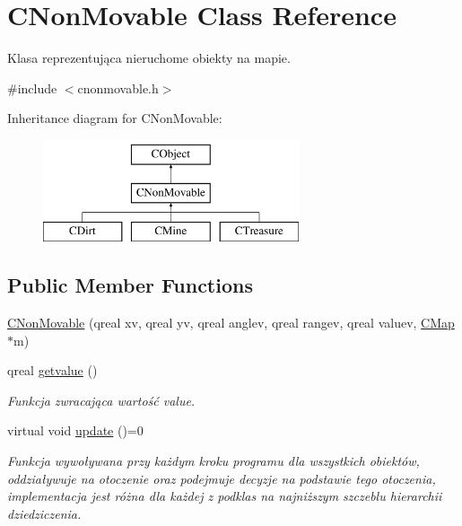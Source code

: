 \hypertarget{class_c_non_movable}{}\section{C\+Non\+Movable Class Reference}
\label{class_c_non_movable}


Klasa reprezentująca nieruchome obiekty na mapie.  




{\ttfamily \#include $<$cnonmovable.\+h$>$}

Inheritance diagram for C\+Non\+Movable\+:\begin{figure}[H]
\begin{center}
\leavevmode
\includegraphics[height=3.000000cm]{class_c_non_movable}
\end{center}
\end{figure}
\subsection*{Public Member Functions}
\begin{DoxyCompactItemize}
\item 
\mbox{\hyperlink{class_c_non_movable_abe455ba26ac2d5b3eb5e99e7a282b9b7}{C\+Non\+Movable}} (qreal xv, qreal yv, qreal anglev, qreal rangev, qreal valuev, \mbox{\hyperlink{class_c_map}{C\+Map}} $\ast$m)
\item 
qreal \mbox{\hyperlink{class_c_non_movable_a34204726d749b5eb66ed763119a46163}{getvalue}} ()
\begin{DoxyCompactList}\small\item\em Funkcja zwracająca wartość value. \end{DoxyCompactList}\item 
virtual void \mbox{\hyperlink{class_c_non_movable_ace03bea0246940c6c5c0b26ffa1ef165}{update}} ()=0
\begin{DoxyCompactList}\small\item\em Funkcja wywoływana przy każdym kroku programu dla wszystkich obiektów, oddziaływuje na otoczenie oraz podejmuje decyzje na podstawie tego otoczenia, implementacja jest różna dla każdej z podklas na najniższym szczeblu hierarchii dziedziczenia. \end{DoxyCompactList}\end{DoxyCompactItemize}
